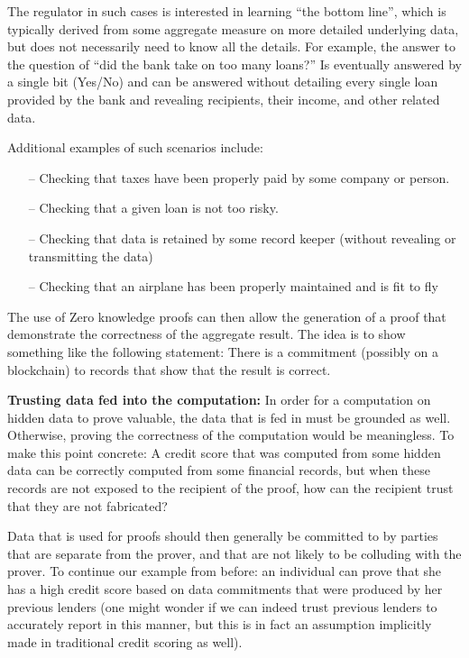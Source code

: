 The regulator in such cases is interested in learning “the bottom line”, which is typically derived from some aggregate measure on more detailed underlying data, but does not necessarily need to know all the details. For example, the answer to the question of “did the bank take on too many loans?” Is eventually answered by a single bit (Yes/No) and can be answered without detailing every single loan provided by the bank and revealing recipients, their income, and other related data. 

Additional examples of such scenarios include: 
\begin{itemize}
    \item[--] Checking that taxes have been properly paid by some company or person.
    \item[--] Checking that a given loan is not too risky.
    \item[--] Checking that data is retained by some record keeper (without revealing or transmitting the data)
    \item[--] Checking that an airplane has been properly maintained and is fit to fly 
\end{itemize}

The use of Zero knowledge proofs can then allow the generation of a proof that demonstrate the correctness of the aggregate result. The idea is to show something like the following statement: There is a commitment (possibly on a blockchain) to records that show that the result is correct. 

\textbf{Trusting data fed into the computation: }
In order for a computation on hidden data to prove valuable, the data that is fed in must be grounded as well. Otherwise, proving the correctness of the computation would be meaningless. To make this point concrete: A credit score that was computed from some hidden data can be correctly computed from some financial records, but when these records are not exposed to the recipient of the proof, how can the recipient trust that they are not fabricated? 

Data that is used for proofs should then generally be committed to by parties that are separate from the prover, and that are not likely to be colluding with the prover. To continue our example from before: an individual can prove that she has a high credit score based on data commitments that were produced by her previous lenders (one might wonder if we can indeed trust previous lenders to accurately report in this manner, but this is in fact an assumption implicitly made in traditional credit scoring as well).   


